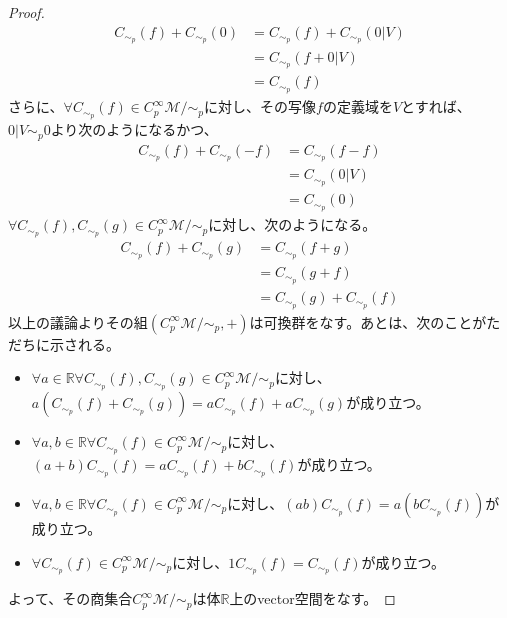 \documentclass[dvipdfmx]{jsarticle}
\begin{document}
\begin{proof}
  \begin{align*}
    C_{\sim_p }\left(f\right)+C_{\sim_p}\left(0\right)&=C_{\sim_p }\left(f\right)+C_{\sim_p}\left(0|V\right)\\
    &=C_{\sim_p }\left(f+0|V\right)\\
    &=C_{\sim_p }\left(f\right)
  \end{align*}
  さらに、$\forall C_{\sim_p } \left(f\right) \in C^\infty_p \mathcal{M}/\sim_p$に対し、その写像$f$の定義域を$V$とすれば、$0|V\sim_p 0$より次のようになるかつ、
  \begin{align*}
    C_{\sim_p }\left(f\right)+C_{\sim_p}\left(-f\right)&=C_{\sim_p }\left(f-f\right)\\
    &=C_{\sim_p }\left(0|V\right)\\
    &=C_{\sim_p }\left(0\right)
  \end{align*}
  $\forall C_{\sim_p } \left(f\right) ,C_{\sim_p } \left(g\right) \in C^\infty_p \mathcal{M}/\sim_p$に対し、次のようになる。
  \begin{align*}
    C_{\sim_p} \left(f\right) +C_{\sim_p } \left(g\right) &=C_{\sim_p } \left(f+g\right) \\
    &=C_{\sim_p } \left(g+f\right) \\
    &=C_{\sim_p } \left(g\right) +C_{\sim_p } \left(f\right) 
  \end{align*}
  以上の議論よりその組$\left(C^\infty_p \mathcal{M}/\sim_p,+\right)$は可換群をなす。あとは、次のことがただちに示される。
  \begin{itemize}
    \item $\forall a\in \mathbb{R} \forall C_{\sim_p }\left(f\right),C_{\sim_p }\left(g\right) \in C^\infty_p \mathcal{M}/\sim_p$に対し、$a\left(C_{\sim_p} \left(f\right)+C_{\sim_p} \left(g\right)\right)=aC_{\sim_p} \left(f\right)+aC_{\sim_p} \left(g\right)$が成り立つ。
    \item $\forall a,b\in \mathbb{R} \forall C_{\sim_p }\left(f\right)\in C^\infty_p \mathcal{M}/\sim_p$に対し、$\left(a+b\right)C_{\sim_p} \left(f\right)=aC_{\sim_p} \left(f\right)+bC_{\sim_p} \left(f\right)$が成り立つ。
    \item $\forall a,b\in \mathbb{R} \forall C_{\sim_p }\left(f\right)\in C^\infty_p \mathcal{M}/\sim_p$に対し、$\left(ab\right)C_{\sim_p} \left(f\right)=a\left(bC_{\sim_p} \left(f\right)\right)$が成り立つ。
    \item $\forall C_{\sim_p }\left(f\right)\in C^\infty_p \mathcal{M}/\sim_p$に対し、$1C_{\sim_p} \left(f\right)=C_{\sim_p} \left(f\right)$が成り立つ。
  \end{itemize}
  よって、その商集合$C^\infty_p \mathcal{M} /\sim_p $は体$\mathbb{R}$上のvector空間をなす。
\end{proof}
\end{document}
